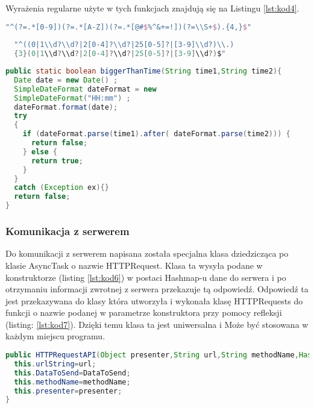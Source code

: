	Wyrażenia regularne użyte w tych funkcjach znajdują się na Listingu \ref{lst:kod4}.
	
	\begin{lstlisting}[caption={Wyrażenia regularne.}, label={lst:kod4}, language=Kotlin]
  "^(?=.*[0-9])(?=.*[A-Z])(?=.*[@#$%^&+=!])(?=\\S+$).{4,}$"
 
  "^((0|1\\d?\\d?|2[0-4]?\\d?|25[0-5]?|[3-9]\\d?)\\.)
  {3}(0|1\\d?\\d?|2[0-4]?\\d?|25[0-5]?|[3-9]\\d?)$"
		\end{lstlisting}

	\begin{lstlisting}[caption={Funkcja odpowiedzialna za sprawdzanie, która data jest pó"zniejsza.}, label={lst:kod5}, language=Java]
public static boolean biggerThanTime(String time1,String time2){
  Date date = new Date() ;
  SimpleDateFormat dateFormat = new 
  SimpleDateFormat("HH:mm") ;
  dateFormat.format(date);
  try 
  {
    if (dateFormat.parse(time1).after( dateFormat.parse(time2))) {
      return false;
    } else {
      return true;
    }
  }
  catch (Exception ex){}	
  return false;
}
	\end{lstlisting}

	\subsubsection{Komunikacja z serwerem}
	Do komunikacji z serwerem napisana została specjalna klasa dziedzicząca po klasie AsyncTask o nazwie HTTPRequest. Klasa ta wysyła podane w konstruktorze (listing \ref{lst:kod6}) w postaci Hashmap-u dane do serwera i po otrzymaniu informacji zwrotnej z serwera przekazuje tą odpowiedź. Odpowiedź ta jest przekazywana do klasy która utworzyła i wykonała klasę HTTPRequests do funkcji o nazwie podanej w parametrze konstruktora przy pomocy refleksji (listing: \ref{lst:kod7}). Dzięki temu klasa ta jest uniwersalna i Może być stosowana w każdym miejscu programu.
	
	\begin{lstlisting}[caption={Konstruktor klasy HTTPRequest.}, label={lst:kod6}, language=Java]
public HTTPRequestAPI(Object presenter,String url,String methodName,HashMap DataToSend) {
  this.urlString=url;
  this.DataToSend=DataToSend;
  this.methodName=methodName;
  this.presenter=presenter;
}
\end{lstlisting}	
	
